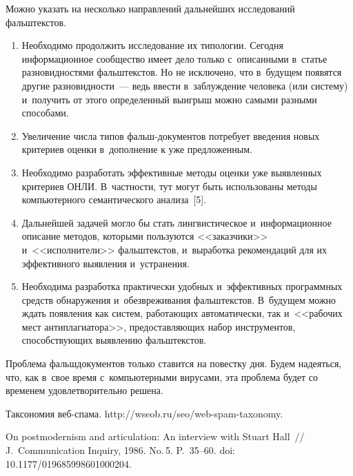 \begin{multicols}{2}
   Можно указать на несколько направлений дальнейших исследований
фальштекстов.
\begin{enumerate}[1.]
\item  Необходимо продолжить исследование их типологии. Сегодня
информационное сообщество имеет дело только с~описанными в~статье
разновидностями фальштекстов. Но не исклю\-чено, что в~будущем появятся
другие разновидности~--- ведь ввести в~заблуждение человека (или систему)
и~получить от этого определенный выигрыш можно самыми разными
способами.
\item
Увеличение числа типов фальш-до\-ку\-мен\-тов потребует
введения новых критериев оценки в~дополнение к уже предложенным.
\item
   Необходимо разработать эффективные методы оценки уже
выявленных критериев \mbox{ОНЛИ}. В~частности, тут могут быть использованы
методы компьютерного семантического анализа~[5].

   \item Дальнейшей задачей могло бы стать лингвистическое
и~информационное описание методов, которыми пользуются <<заказчики>>
и~<<исполнители>> фальш\-текс\-тов, и~выработка рекомендаций для их
эффективного выявления и~устранения.

\item Необходима разработка практически удобных
и~эффективных программных средств обнаружения и~обезвреживания
фальш\-текс\-тов. В~будущем можно ждать появления как систем, работающих
автоматически, так и~<<рабочих мест антиплагиатора>>, предоставляющих
набор инструментов, способствующих выявлению фальш\-текстов.
\end{enumerate}

   Проблема фальшдо\-ку\-мен\-тов только ставится на повестку дня. Будем
надеяться, что, как в~свое время с~компьютерными вирусами, эта проблема
будет со временем удовлетворительно решена.

{\small\frenchspacing
 {%
 \begin{thebibliography}{99}

 Таксономия веб-спа\-ма. {\sf
http://wseob.ru/seo/web-spam-taxonomy}.

 On postmodernism and articulation: An interview with Stuart Hall~//
J.~Communication Inquiry, 1986. No.\,5. P.~35--60.
doi: 10.1177/019685998601000204.



\end{thebibliography}}}
\end{multicols}
